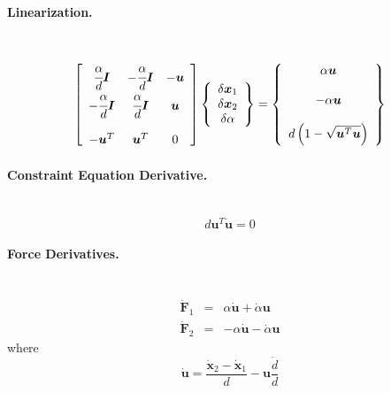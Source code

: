 \documentclass[10pt,dvips,fleqn,subeqn]{report}
\newcommand{\T}[1]{\boldsymbol{#1}}
\begin{document}
\paragraph{Linearization.} \
\begin{equation}
	\sqbr{\matr{ccc}{
		\cfrac{\alpha}{d}\T{I} & -\cfrac{\alpha}{d}\T{I} & -\T{u} \\
		-\cfrac{\alpha}{d}\T{I} & \cfrac{\alpha}{d}\T{I} & \T{u} \\
		\\
		-\T{u}^T & \T{u}^T & 0
	}}\cubr{\cvvect{
		\delta\T{x}_1 \\
		\delta\T{x}_2 \\
		\delta\alpha
	}} = \cubr{\cvvect{
		\alpha \T{u} \\
		\\
		- \alpha \T{u} \\
		\\
		d\plbr{1 - \sqrt{\T{u}^T \T{u}}}
	}}
\end{equation}

\paragraph{Constraint Equation Derivative.} \
\begin{equation}
	d \T{u}^T \dot{\T{u}} = 0
\end{equation}

\paragraph{Force Derivatives.} \
\begin{eqnarray}
	\dot{\T{F}}_1 & = & \alpha \dot{\T{u}} + \dot{\alpha} \T{u} \\
	\dot{\T{F}}_2 & = & -\alpha \dot{\T{u}} - \dot{\alpha} \T{u}
\end{eqnarray}
where
\begin{equation}
	\dot{\T{u}} = \frac{\dot{\T{x}}_2 - \dot{\T{x}}_1}{d} - \T{u} \frac{\dot{d}}{d}
\end{equation}
\end{document}
